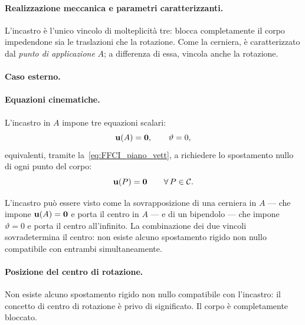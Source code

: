 \paragraph{Realizzazione meccanica e parametri caratterizzanti.}
L'incastro è l'unico vincolo di molteplicità tre: blocca
completamente il corpo impedendone sia le traslazioni che
la rotazione. Come la cerniera, è caratterizzato dal
\emph{punto di applicazione} $A$; a differenza di essa,
vincola anche la rotazione.

\paragraph{Caso esterno.}

\paragraph{Equazioni cinematiche.}
L'incastro in $A$ impone tre equazioni scalari:
\begin{equation}\label{eq:incastro_cin}
	\mathbf{u}(A) = \mathbf{0}, \qquad \vartheta = 0,
\end{equation}
equivalenti, tramite la~\eqref{eq:FFCI_piano_vett}, a
richiedere lo spostamento nullo di ogni punto del corpo:
\begin{equation}
	\mathbf{u}(P) = \mathbf{0} \qquad \forall\, P \in \mathcal{C}.
\end{equation}

\begin{oss}
	L'incastro può essere visto come la sovrapposizione di
	una cerniera in $A$ --- che impone $\mathbf{u}(A) = \mathbf{0}$
	e porta il centro in $A$ --- e di un bipendolo --- che
	impone $\vartheta = 0$ e porta il centro all'infinito.
	La combinazione dei due vincoli sovradetermina il centro:
	non esiste alcuno spostamento rigido non nullo compatibile
	con entrambi simultaneamente.
\end{oss}

\paragraph{Posizione del centro di rotazione.}
Non esiste alcuno spostamento rigido non nullo compatibile
con l'incastro: il concetto di centro di rotazione è privo
di significato. Il corpo è completamente bloccato.

